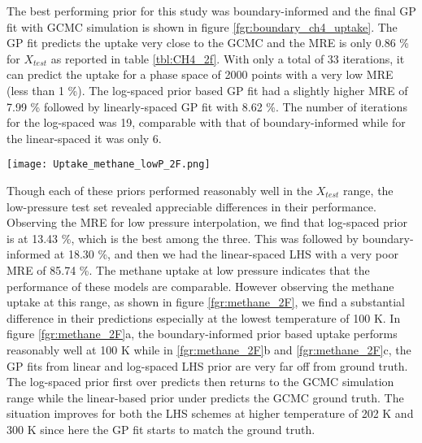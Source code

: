 \documentclass[twoside,twocolumn,9pt]{article}
\begin{document}
The best performing prior for this study was boundary-informed and the final GP fit with GCMC simulation is shown in figure \ref{fgr:boundary_ch4_uptake}. %
The GP fit predicts the uptake very close to the GCMC and the MRE is only 0.86 \% for $X_{test}$ as reported in table \ref{tbl:CH4_2f}. %
With only a total of 33 iterations, it can predict the uptake for a phase space of 2000 points with a very low MRE (less than 1 \%). The log-spaced prior based GP fit had a slightly higher MRE of 7.99 \% followed by linearly-spaced GP fit with 8.62 \%. The number of iterations for the log-spaced was 19, comparable with that of boundary-informed while for the linear-spaced it was only 6.

\begin{figure*}
\centering
  \texttt{[image: Uptake\_methane\_lowP\_2F.png]}
  \caption{Methane uptake comparison between GP and GCMC simulation in Cu-BTC at low pressure range for different priors, a) Boundary-informed prior, b) Linear-spaced LHS prior, and c) Log-spaced LHS prior}
  \label{fgr:methane_2F}
\end{figure*}

Though each of these priors performed reasonably well in the $X_{test}$ range, the low-pressure test set revealed appreciable differences in their performance. Observing the MRE for low pressure interpolation, we find that log-spaced prior is at 13.43 \%, which is the best among the three. This was followed by boundary-informed at 18.30 \%, and then we had the linear-spaced LHS with a very poor MRE of 85.74 \%. The methane uptake at low pressure indicates that the performance of these models are comparable. However observing the methane uptake at this range, as shown in figure \ref{fgr:methane_2F}, we find a substantial difference in their predictions especially at the lowest temperature of 100 K. In figure \ref{fgr:methane_2F}a, the boundary-informed prior based uptake performs reasonably well at 100 K while in \ref{fgr:methane_2F}b and \ref{fgr:methane_2F}c, the GP fits from linear and log-spaced LHS prior are very far off from ground truth. The log-spaced prior first over predicts then returns to the GCMC simulation range while the linear-based prior under predicts the GCMC ground truth. The situation improves for both the LHS schemes at higher temperature of 202 K and 300 K since here the GP fit starts to match the ground truth. 
\end{document}

